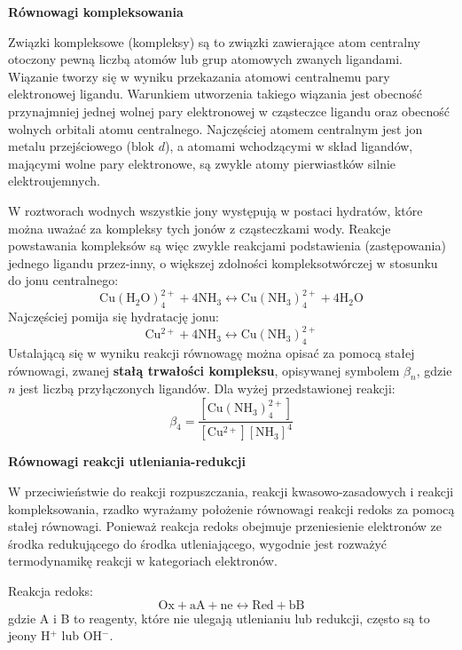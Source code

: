 \documentclass{article}
\begin{document}
\textbf{Równowagi kompleksowania}

Związki kompleksowe (kompleksy) są to związki zawierające atom centralny otoczony pewną liczbą atomów lub grup atomowych zwanych ligandami. Wiązanie tworzy się w wyniku przekazania atomowi centralnemu pary elektronowej ligandu. Warunkiem utworzenia takiego wiązania jest obecność przynajmniej jednej wolnej pary elektronowej w cząsteczce ligandu oraz obecność wolnych orbitali atomu centralnego. Najczęściej atomem centralnym jest jon metalu przejściowego (blok $d$), a atomami wchodzącymi w skład ligandów, mającymi wolne pary elektronowe, są zwykle atomy pierwiastków silnie elektroujemnych. 

W roztworach wodnych wszystkie jony występują w postaci hydratów, które można uważać za kompleksy tych jonów z cząsteczkami wody. Reakcje powstawania kompleksów są więc zwykle reakcjami podstawienia (zastępowania) jednego ligandu przez-inny, o większej zdolności kompleksotwórczej w stosunku do jonu centralnego:
\begin{equation*}
    \mathrm{Cu(H_2O)_4^{2+}}+4\mathrm{NH_3} \longleftrightarrow\mathrm{Cu(NH_3)_4^{2+}} + \mathrm{4H_2O}
\end{equation*}
Najczęściej pomija się hydratację jonu:
\begin{equation*}
    \mathrm{Cu^{2+}}+4\mathrm{NH_3}\longleftrightarrow \mathrm{Cu(NH_3)_4^{2+}}
\end{equation*}
Ustalającą się w wyniku reakcji równowagę można opisać za pomocą stałej równowagi, zwanej \textbf{stałą trwałości kompleksu}, opisywanej symbolem $\beta_n$, gdzie $n$ jest liczbą przyłączonych ligandów. Dla wyżej przedstawionej reakcji:
\begin{equation*}
    \beta_4=\frac{[\mathrm{Cu(NH_3)_4^{2+}}]}{[\mathrm{Cu^{2+}}][\mathrm{NH_3}]^4}
\end{equation*}

\textbf{Równowagi reakcji utleniania-redukcji}

W przeciwieństwie do reakcji rozpuszczania, reakcji kwasowo-zasadowych i reakcji kompleksowania, rzadko wyrażamy położenie równowagi reakcji redoks za pomocą stałej równowagi. Ponieważ reakcja redoks obejmuje przeniesienie elektronów ze środka redukującego do środka utleniającego, wygodnie jest rozważyć termodynamikę reakcji w kategoriach elektronów.

Reakcja redoks:
\begin{equation*}
    \mathrm{Ox}+\mathrm{aA}+\mathrm{ne} \longleftrightarrow \mathrm{Red}+\mathrm{bB}
\end{equation*}
gdzie A i B to reagenty, które nie ulegają utlenianiu lub redukcji, często są to jeony H$^+$ lub OH$^-$.
\end{document}
